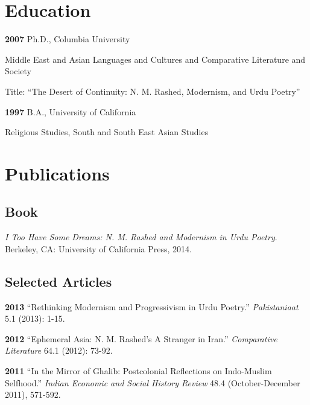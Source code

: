 \documentclass[letterpaper,12pt]{article}
\newenvironment{DUlineblock}[1]{%
    \list{}{\setlength{\partopsep}{\parskip}
            \addtolength{\partopsep}{\baselineskip}
            \setlength{\topsep}{0pt}
            \setlength{\itemsep}{0.15\baselineskip}
            \setlength{\parsep}{0pt}
            \setlength{\leftmargin}{#1}}
    \raggedright
  }
  {\endlist}
\begin{document}
\section{Education%
  \label{education}%
}

\begin{DUlineblock}{0em}
\item[] \textbf{2007}
Ph.D., Columbia University
\item[]
\begin{DUlineblock}{\DUlineblockindent}
\item[] Middle East and Asian Languages and Cultures and Comparative Literature and Society
\item[] Title: “The Desert of Continuity: N. M. Rashed, Modernism, and Urdu Poetry”
\end{DUlineblock}
\item[] \textbf{1997}
B.A., University of California
\item[]
\begin{DUlineblock}{\DUlineblockindent}
\item[] Religious Studies, South and South East Asian Studies
\end{DUlineblock}
\end{DUlineblock}


\section{Publications%
  \label{publications}%
}


\subsection{Book%
  \label{book}%
}

\emph{I Too Have Some Dreams: N. M. Rashed and Modernism in Urdu Poetry}.
Berkeley, CA: University of California Press, 2014.


\subsection{Selected Articles%
  \label{selected-articles}%
}

\textbf{2013}
“Rethinking Modernism and Progressivism in Urdu Poetry.”
\emph{Pakistaniaat} 5.1 (2013): 1-15.

\textbf{2012}
“Ephemeral Asia: N. M. Rashed’s A Stranger in Iran.”
\emph{Comparative Literature} 64.1 (2012): 73-92.

\textbf{2011}
“In the Mirror of Ghalib: Postcolonial Reflections on Indo-Muslim Selfhood.”
\emph{Indian Economic and Social History Review} 48.4 (October-December 2011), 571-592.
\end{document}
